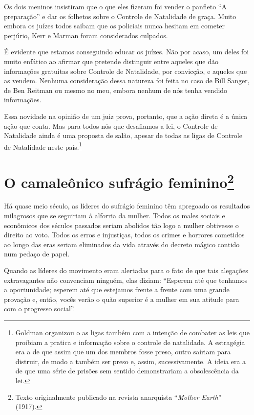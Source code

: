 Os dois meninos insistiram que o que eles fizeram foi vender o panfleto
``A preparação'' e dar os folhetos sobre o Controle de Natalidade de
graça. Muito embora os juízes todos saibam que os policiais nunca
hesitam em cometer perjúrio, Kerr e Marman foram considerados culpados.

É evidente que estamos conseguindo educar os juízes. Não por acaso, um
deles foi muito enfático ao afirmar que pretende distinguir entre
aqueles que dão informações gratuitas sobre Controle de Natalidade, por
convicção, e aqueles que as vendem. Nenhuma consideração dessa natureza
foi feita no caso de Bill Sanger, de Ben Reitman ou mesmo no meu, embora
nenhum de nós tenha vendido informações.

Essa novidade na opinião de um juiz prova, portanto, que a ação direta é
a única ação que conta. Mas para todos nós que desafiamos a lei, o
Controle de Natalidade ainda é uma proposta de salão, apesar de todas as
ligas de Controle de Natalidade neste país.\footnote{Goldman organizou o
  as ligas também com a intenção de combater as leis que proibiam a
  pratica e informação sobre o controle de natalidade. A estragégia era
  a de que assim que um dos membros fosse preso, outro saíriam para
  distruir, de modo a também ser preso e, assim, sucessivamente. A ideia
  era a de que uma série de prisões sem sentido demonstrariam a
  obsolescência da lei.}

\chapter[O camaleônico sufrágio feminino (1917)]{O camaleônico sufrágio feminino\footnote[*]{Texto originalmente publicado
  na revista anarquista ``\emph{Mother Earth}'' (1917).}}

Há quase meio século, as líderes do sufrágio feminino têm apregoado os
resultados milagrosos que se seguiriam à alforria da mulher. Todos os
males sociais e econômicos dos séculos passados seriam abolidos tão logo
a mulher obtivesse o direito ao voto. Todos os erros e injustiças, todos
os crimes e horrores cometidos ao longo das eras seriam eliminados da
vida através do decreto mágico contido num pedaço de papel.

Quando as líderes do movimento eram alertadas para o fato de que tais
alegações extravagantes não convenciam ninguém, elas diziam: ``Esperem
até que tenhamos a oportunidade; esperem até que estejamos frente a
frente com uma grande provação e, então, vocês verão o quão superior é a
mulher em sua atitude para com o progresso social''.

